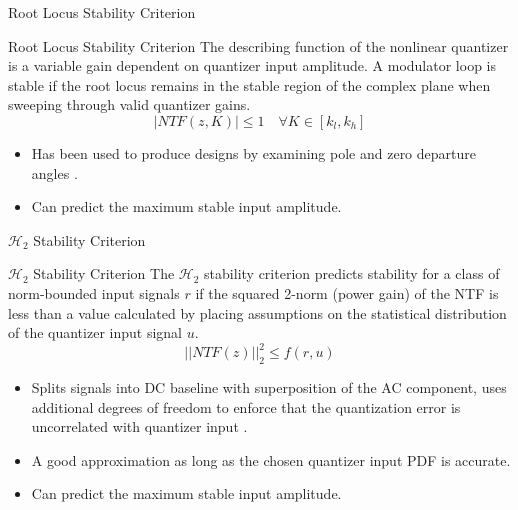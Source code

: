 \documentclass[10pt,usenames,dvipsnames]{beamer}
\begin{document}
\begin{frame}{Root Locus Stability Criterion}

\begin{block}{Root Locus Stability Criterion}
	The describing function of the nonlinear quantizer is a variable gain dependent on quantizer input amplitude. A modulator loop is stable if the root locus remains in the stable region of the complex plane when sweeping through valid quantizer gains.
	\begin{equation*}
		|NTF(z, K)| \leq 1 \quad \forall K \in [k_l, k_h]
	\end{equation*}
\end{block}
\pause
\begin{itemize}
	\item Has been used to produce designs by examining pole and zero departure angles \cite{Yang2002, Kuo2006, Kang2014}. \pause
	\item Can predict the maximum stable input amplitude.
\end{itemize}

\end{frame}

\begin{frame}{$\mathcal{H}_2$ Stability Criterion}

\begin{block}{$\mathcal{H}_2$ Stability Criterion}
	The $\mathcal{H}_2$ stability criterion predicts stability for a class of norm-bounded input signals $r$ if the squared 2-norm (power gain) of the NTF is less than a value calculated by placing assumptions on the statistical distribution of the quantizer input signal $u$.
	\begin{equation*}
		||NTF(z)||_2^2 \leq f(r,u)
	\end{equation*}
\end{block}
\pause
\begin{itemize}
	\item Splits signals into DC baseline with superposition of the AC component, uses additional degrees of freedom to enforce that the quantization error is uncorrelated with quantizer input \cite{Risbo1994}. \pause
	\item A good approximation as long as the chosen quantizer input PDF is accurate. \pause
	\item Can predict the maximum stable input amplitude.
\end{itemize}

\end{frame}
\end{document}
